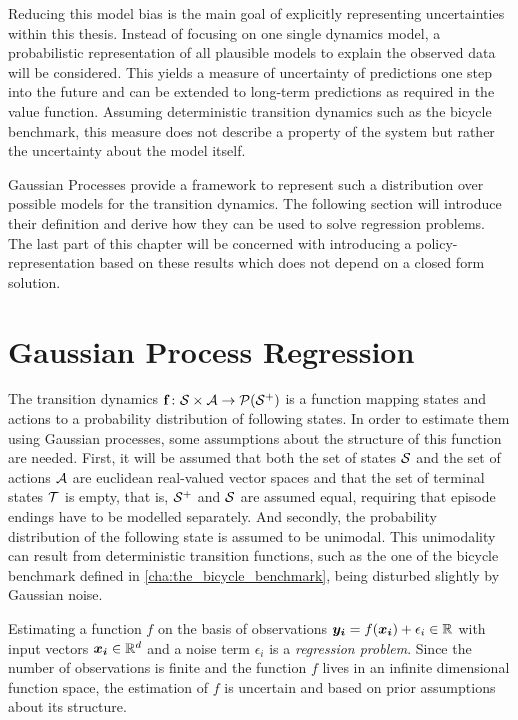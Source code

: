 Reducing this model bias is the main goal of explicitly representing uncertainties within this thesis.
Instead of focusing on one single dynamics model, a probabilistic representation of all plausible models to explain the observed data will be considered.
This yields a measure of uncertainty of predictions one step into the future and can be extended to long-term predictions as required in the value function.
Assuming deterministic transition dynamics such as the bicycle benchmark, this measure does not describe a property of the system but rather the uncertainty about the model itself.

Gaussian Processes provide a framework to represent such a distribution over possible models for the transition dynamics.
The following section will introduce their definition and derive how they can be used to solve regression problems.
The last part of this chapter will be concerned with introducing a policy-representation based on these results which does not depend on a closed form solution.

\section{Gaussian Process Regression}
\label{sec:gp_regression}
The transition dynamics $\operatorname{\mathbf{f}} \colon \mathcal{S} \times \mathcal{A} \to \operatorname{\mathcal{P}}(\mathcal{S}^+)$ is a function mapping states and actions to a probability distribution of following states.
In order to estimate them using Gaussian processes, some assumptions about the structure of this function are needed.
First, it will be assumed that both the set of states $\mathcal{S}$ and the set of actions $\mathcal{A}$ are euclidean real-valued vector spaces and that the set of terminal states $\mathcal{T}$ is empty, that is, $\mathcal{S}^+$ and $\mathcal{S}$ are assumed equal, requiring that episode endings have to be modelled separately.
And secondly, the probability distribution of the following state is assumed to be unimodal.
This unimodality can result from deterministic transition functions, such as the one of the bicycle benchmark defined in \cref{cha:the_bicycle_benchmark}, being disturbed slightly by Gaussian noise.

Estimating a function $f$ on the basis of observations $\bm{y_i} = f(\bm{x_i}) + \epsilon_i \in \mathbb{R}$ with input vectors $\bm{x_i} \in \mathbb{R}^d$ and a noise term $\epsilon_i$ is a \emph{regression problem}.
Since the number of observations is finite and the function $f$ lives in an infinite dimensional function space, the estimation of $f$ is uncertain and based on prior assumptions about its structure.

